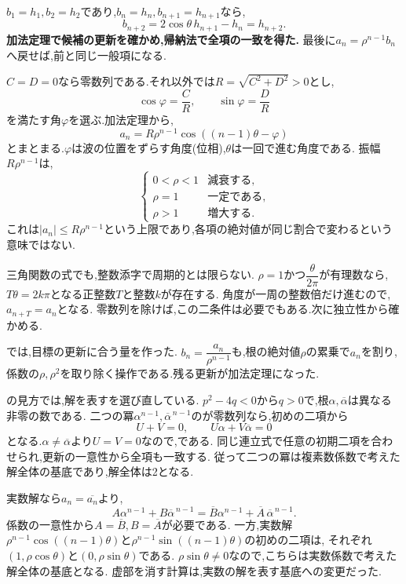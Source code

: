   $b_1=h_1,b_2=h_2$であり,$b_n=h_n,b_{n+1}=h_{n+1}$なら,
  \[
    b_{n+2}=2\cos\theta\,h_{n+1}-h_n=h_{n+2}.
  \]
  \textbf{加法定理で候補の更新を確かめ,帰納法で全項の一致を得た.}
  最後に$a_n=\rho^{n-1}b_n$へ戻せば,前と同じ一般項になる.

  $C=D=0$なら零数列である.それ以外では$R=\sqrt{C^2+D^2}>0$とし,
  \[
    \cos\varphi=\frac CR,\qquad \sin\varphi=\frac DR
  \]
  を満たす角$\varphi$を選ぶ.加法定理から,
  \[
    a_n=R\rho^{n-1}\cos((n-1)\theta-\varphi)
  \]
  とまとまる.$\varphi$は波の位置をずらす角度(位相),$\theta$は一回で進む角度である.
  振幅$R\rho^{n-1}$は,
  \[
    \begin{cases}
      0<\rho<1 & \text{減衰する},\\
      \rho=1 & \text{一定である},\\
      \rho>1 & \text{増大する}.
    \end{cases}
  \]
  これは$|a_n|\le R\rho^{n-1}$という上限であり,各項の絶対値が同じ割合で変わるという意味ではない.

  三角関数の式でも,整数添字で周期的とは限らない.
  $\rho=1$かつ$\dfrac{\theta}{2\pi}$が有理数なら,$T\theta=2k\pi$となる正整数$T$と整数$k$が存在する.
  角度が一周の整数倍だけ進むので,$a_{n+T}=a_n$となる.
  零数列を除けば,この二条件は必要でもある.次に独立性から確かめる.

  \label{解釈：虚数解と基本解}
  では,目標の更新に合う量を作った.
  $b_n=\dfrac{a_n}{\rho^{n-1}}$も,根の絶対値$\rho$の累乗で$a_n$を割り,
  係数の$\rho,\rho^2$を取り除く操作である.残る更新が加法定理になった.

  の見方では,解を表すを選び直している.
  $p^2-4q<0$から$q>0$で,根$\alpha,\overline\alpha$は異なる非零の数である.
  二つの冪$\alpha^{n-1},\overline\alpha^{\,n-1}$のが零数列なら,初めの二項から
  \[
    U+V=0,\qquad U\alpha+V\overline\alpha=0
  \]
  となる.$\alpha\ne\overline\alpha$より$U=V=0$なので,である.
  同じ連立式で任意の初期二項を合わせられ,更新の一意性から全項も一致する.
  従って二つの冪は複素数係数で考えた解全体の基底であり,解全体は2となる.

  実数解なら$a_n=\overline{a_n}$より,
  \[
    A\alpha^{n-1}+B\overline\alpha^{\,n-1}
    =\overline B\alpha^{n-1}+\overline A\,\overline\alpha^{\,n-1}.
  \]
  係数の一意性から$A=\overline B,B=\overline A$が必要である.
  一方,実数解$\rho^{n-1}\cos((n-1)\theta)$と$\rho^{n-1}\sin((n-1)\theta)$の初めの二項は,
  それぞれ$(1,\rho\cos\theta)$と$(0,\rho\sin\theta)$である.
  $\rho\sin\theta\ne0$なので,こちらは実数係数で考えた解全体の基底となる.
  虚部を消す計算は,実数の解を表す基底への変更だった.

